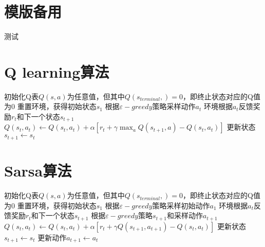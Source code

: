 \documentclass[11pt]{ctexart}
\begin{document}
\tableofcontents %
\clearpage
\section{模版备用}
\begin{algorithm}[H] %
	\renewcommand{\thealgorithm}{} %
	\caption{} 
	\begin{algorithmic}[1] %
		\STATE 测试
	\end{algorithmic}
\end{algorithm}
\clearpage
\section{Q learning算法}
\begin{algorithm}[H] %
	\renewcommand{\thealgorithm}{} %
	\caption{} 
	\begin{algorithmic}[1] %
		\STATE 初始化Q表$Q(s,a)$为任意值，但其中$Q(s_{terminal},)=0$，即终止状态对应的Q值为0
			\STATE 重置环境，获得初始状态$s_1$
				\STATE 根据$\varepsilon-greedy$策略采样动作$a_t$
				\STATE 环境根据$a_t$反馈奖励$r_t$和下一个状态$s_{t+1}$
				\STATE $Q(s_t,a_t) \leftarrow Q(s_t,a_t)+\alpha[r_t+\gamma\max _{a}Q(s_{t+1},a)-Q(s_t,a_t)]$
				\STATE 更新状态$s_{t+1} \leftarrow s_t$
			\ENDFOR
		\ENDFOR
	\end{algorithmic}
\end{algorithm}
\clearpage
\section{Sarsa算法}
\begin{algorithm}[H] %
	\renewcommand{\thealgorithm}{} %
	\caption{} 
	\begin{algorithmic}[1] %
		\STATE 初始化Q表$Q(s,a)$为任意值，但其中$Q(s_{terminal},)=0$，即终止状态对应的Q值为0
			\STATE 重置环境，获得初始状态$s_1$
			\STATE 根据$\varepsilon-greedy$策略采样初始动作$a_1$
				\STATE 环境根据$a_t$反馈奖励$r_t$和下一个状态$s_{t+1}$
				\STATE 根据$\varepsilon-greedy$策略$s_{t+1}$和采样动作$a_{t+1}$
				\STATE $Q(s_t,a_t) \leftarrow Q(s_t,a_t)+\alpha[r_t+\gamma Q(s_{t+1},a_{t+1})-Q(s_t,a_t)]$
				\STATE 更新状态$s_{t+1} \leftarrow s_t$
				\STATE 更新动作$a_{t+1} \leftarrow a_t$
			\ENDFOR
		\ENDFOR
	\end{algorithmic}
\end{algorithm}
\clearpage
\end{document}
